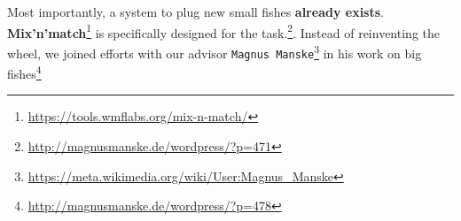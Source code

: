 Most importantly, a system to plug new small fishes \textbf{already exists}. \textbf{Mix'n'match}\footnote{\url{https://tools.wmflabs.org/mix-n-match/}} is specifically designed for the task.\footnote{\url{http://magnusmanske.de/wordpress/?p=471}}. Instead of reinventing the wheel, we joined efforts with our advisor \texttt{Magnus Manske}\footnote{\url{https://meta.wikimedia.org/wiki/User:Magnus_Manske}} in his work on big fishes\footnote{\url{http://magnusmanske.de/wordpress/?p=478}}

